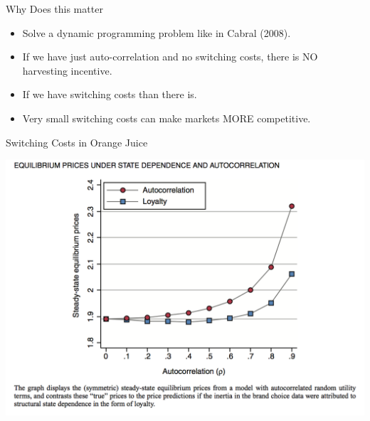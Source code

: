\documentclass[xcolor=pdftex,dvipsnames,table,mathserif,aspectratio=169]{beamer}
\begin{document}
\begin{frame}{Why Does this matter}
\begin{itemize}
\item Solve a dynamic programming problem like in Cabral (2008).
\item If we have just auto-correlation and no switching costs, there is NO harvesting incentive.
\item If we have switching costs than there is.
\item Very small switching costs can make markets MORE competitive.
\end{itemize}

\end{frame}


\begin{frame}{Switching Costs in Orange Juice}
\begin{center}
\includegraphics[scale=0.33]{resources/OJ_F12.png}
\end{center}
\end{frame}
\end{document}
